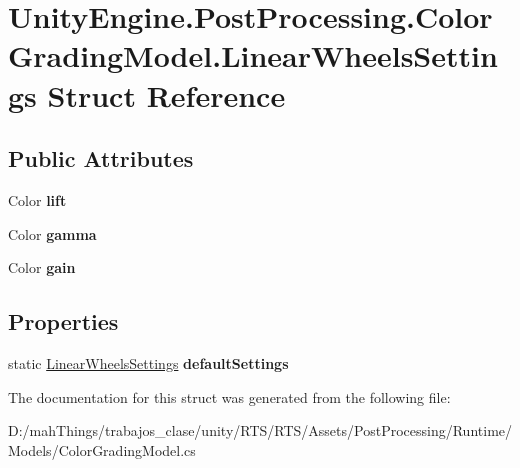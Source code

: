 \hypertarget{struct_unity_engine_1_1_post_processing_1_1_color_grading_model_1_1_linear_wheels_settings}{}\section{Unity\+Engine.\+Post\+Processing.\+Color\+Grading\+Model.\+Linear\+Wheels\+Settings Struct Reference}
\label{struct_unity_engine_1_1_post_processing_1_1_color_grading_model_1_1_linear_wheels_settings}
\subsection*{Public Attributes}
\begin{DoxyCompactItemize}
\item 
\mbox{\label{struct_unity_engine_1_1_post_processing_1_1_color_grading_model_1_1_linear_wheels_settings_a6d552fe0196a7b47687cc7c7467f94ae}} 
Color {\bfseries lift}
\item 
\mbox{\label{struct_unity_engine_1_1_post_processing_1_1_color_grading_model_1_1_linear_wheels_settings_a7d58d6b75b02b9c32a17eadf61ca3be8}} 
Color {\bfseries gamma}
\item 
\mbox{\label{struct_unity_engine_1_1_post_processing_1_1_color_grading_model_1_1_linear_wheels_settings_a283b912d257aa47d32d41d0b03e1e4a2}} 
Color {\bfseries gain}
\end{DoxyCompactItemize}
\subsection*{Properties}
\begin{DoxyCompactItemize}
\item 
\mbox{\label{struct_unity_engine_1_1_post_processing_1_1_color_grading_model_1_1_linear_wheels_settings_a6f56229efcbc3784f78c253221883a70}} 
static \mbox{\hyperlink{struct_unity_engine_1_1_post_processing_1_1_color_grading_model_1_1_linear_wheels_settings}{Linear\+Wheels\+Settings}} {\bfseries default\+Settings}
\end{DoxyCompactItemize}


The documentation for this struct was generated from the following file\+:\begin{DoxyCompactItemize}
\item 
D\+:/mah\+Things/trabajos\+\_\+clase/unity/\+R\+T\+S/\+R\+T\+S/\+Assets/\+Post\+Processing/\+Runtime/\+Models/Color\+Grading\+Model.\+cs\end{DoxyCompactItemize}
